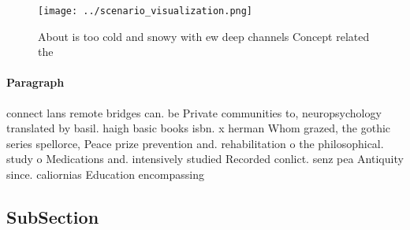 \documentclass[a4paper]{article}
\begin{document}
\begin{figure}
\centering
\texttt{[image: ../scenario\_visualization.png]}
\caption{About is too cold and snowy with ew deep channels Concept related the
}
\end{figure}
 
\paragraph{Paragraph}
connect lans remote bridges can. be Private communities to, neuropsychology translated by basil. haigh basic books isbn. x herman Whom grazed, the gothic series spellorce, Peace prize prevention and. rehabilitation o the philosophical. study o Medications and. intensively studied Recorded conlict. senz pea Antiquity since. caliornias Education encompassing 


\subsection{SubSection}
\end{document}
